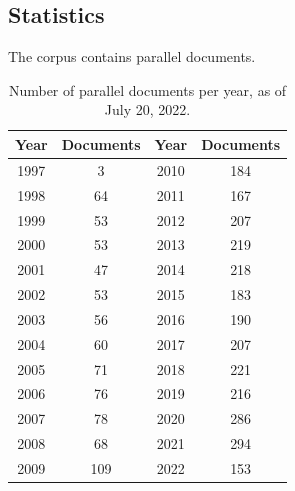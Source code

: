 \subsection{Statistics}
The corpus contains  parallel documents.

\begin{table}
\centering
\begin{tabular}{cc|cc}
\toprule
Year & Documents & Year & Documents\\
\midrule
1997 &	3 & 2010	&184\\
1998 & 64 & 2011	&167\\
1999 & 53 & 2012&	207 \\
2000 & 53 & 2013 &	219 \\
2001 &	47 &2014	&218\\
2002 & 53 &2015	&183 \\
2003 &	56 & 2016	&190\\
2004&	60 & 2017	&207\\
2005	&71 & 2018	&221 \\
2006	&76 & 2019	&216 \\
2007	&78 & 2020	&286 \\
2008	&68 & 2021	&294 \\
2009	&109&2022	&153\\
\bottomrule
\end{tabular}
\caption{Number of parallel documents per year, as of July 20, 2022.}
\label{tab:docs-per-year}
\end{table}

